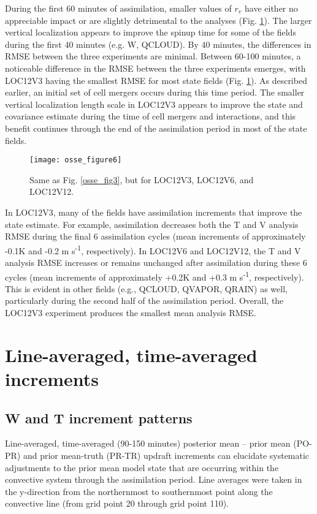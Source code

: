 During the first 60 minutes of assimilation, smaller values of \(r_v\) have either no appreciable impact or are slightly detrimental to the analyses (Fig. \ref{osse_fig6}). The larger vertical localization appears to improve the spinup time for some of the fields during the first 40 minutes (e.g. W, QCLOUD). By 40 minutes, the differences in RMSE between the three experiments are minimal. Between 60-100 minutes, a noticeable difference in the RMSE between the three experiments emerges, with LOC12V3 having the smallest RMSE for most state fields (Fig. \ref{osse_fig6}). As described earlier, an initial set of cell mergers occurs during this time period. The smaller vertical localization length scale in LOC12V3 appears to improve the state and covariance estimate during the time of cell mergers and interactions, and this benefit continues through the end of the assimilation period in most of the state fields.

\begin{figure}
\centering
\texttt{[image: osse\_figure6]}
\caption{Same as Fig. \ref{osse_fig3}, but for LOC12V3, LOC12V6, and LOC12V12.}
\label{osse_fig6}
\end{figure}

In LOC12V3, many of the fields have assimilation increments that improve the state estimate. For example, assimilation decreases both the T and V analysis RMSE during the final 6 assimilation cycles (mean increments of approximately -0.1K and -0.2 m s\textsuperscript{-1}, respectively). In LOC12V6 and LOC12V12, the T and V analysis RMSE increases or remains unchanged after assimilation during these 6 cycles (mean increments of approximately +0.2K and +0.3 m s\textsuperscript{-1}, respectively). This is evident in other fields (e.g., QCLOUD, QVAPOR, QRAIN) as well, particularly during the second half of the assimilation period. Overall, the LOC12V3 experiment produces the smallest mean analysis RMSE. 

\section{Line-averaged, time-averaged increments}
\subsection{W and T increment patterns}
Line-averaged, time-averaged (90-150 minutes) posterior mean – prior mean (PO-PR) and prior mean-truth (PR-TR) updraft increments can elucidate systematic adjustments to the prior mean model state that are occurring within the convective system through the assimilation period. Line averages were taken in the y-direction from the northernmost to southernmost point along the convective line (from grid point 20 through grid point 110).

